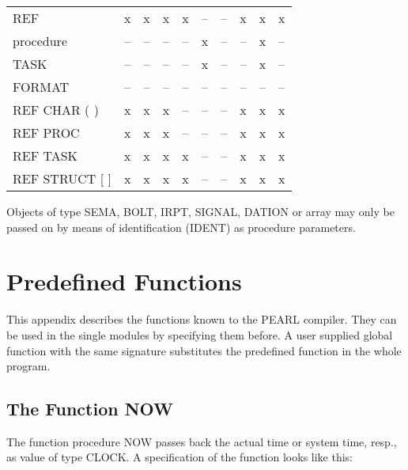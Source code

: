 \begin{table}[htb]
\begin{tabular}{lccccccccc}
REF            & x     &  x      & x     &  x     &  --   &   --   &  x  &    x   &  x   \\
procedure      & --    &  --     & --    &  --    &  x    &   --   &  -- &    x   &  --  \\
TASK           & --    &  --     & --    &  --    &  x    &   --   &  -- &    x   &  --  \\
FORMAT         & --    &  --     & --    &  --    &  --   &   --   &  -- &    --  &  --  \\
REF CHAR ( )   & x     &  x      & x     &  --    &  --   &   --   &  x  &    x   &  x   \\
REF PROC       & x     &  x      & x     &  --    &  --   &   --   &  x  &    x   &  x   \\
REF TASK       & x     &  x      & x     &  x     &  --   &   --   &  x  &    x   &  x   \\
REF STRUCT [ ] & x     &  x      & x     &  x     &  --   &   --   &  x  &    x   &  x   \\
\end{tabular}
\end{table}
                                                                                 
Objects of type SEMA, BOLT, IRPT, SIGNAL, DATION or array may only be 
passed on by means of identification (IDENT) as procedure parameters.

\newpage
\section{Predefined Functions}   %

This appendix describes the functions known to the PEARL compiler. They
can be used in the single modules 
by
 specifying them before. 
A user supplied global function with the same signature substitutes
the predefined function in the whole program.

\subsection{The Function NOW}    %

The function procedure NOW passes back the actual time or system time, resp., 
as value of type CLOCK. A specification of the function looks like this:\\

